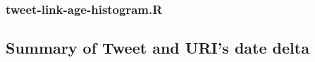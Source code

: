 \subsubsection{tweet-link-age-histogram.R}



\subsection{Summary of Tweet and URI's date delta}
\begingroup
\obeylines

\endgroup
